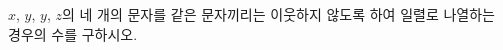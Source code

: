 \hspace*{2mm}\begin{minipage}[t]{\dimexpr\linewidth-2mm\relax}\vspace{0pt}
$x$, $y$, $y$, $z$의 네 개의 문자를 같은 문자끼리는 이웃하지 않도록 하여 일렬로 나열하는 경우의 수를 구하시오.\end{minipage}
